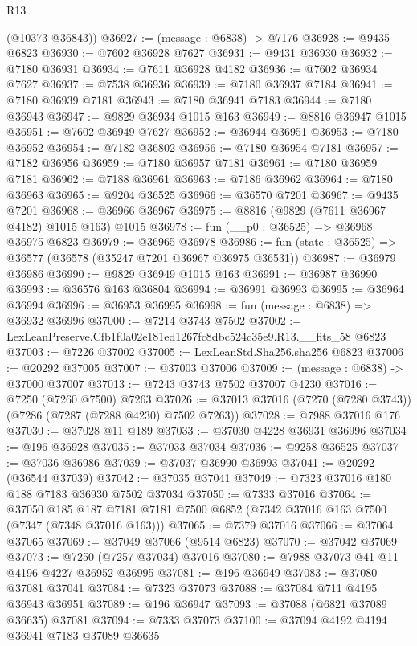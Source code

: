 \begin{lexlean}{R13}
\begin{coremodule}
      (@10373 @36843))
@36927 := (message : @6838) -> @7176
@36928 := @9435 @6823
@36930 := @7602 @36928 @7627
@36931 := @9431 @36930
@36932 := @7180 @36931
@36934 := @7611 @36928 @4182
@36936 := @7602 @36934 @7627
@36937 := @7538 @36936
@36939 := @7180 @36937 @7184
@36941 := @7180 @36939 @7181
@36943 := @7180 @36941 @7183
@36944 := @7180 @36943
@36947 := @9829 @36934 @1015 @163
@36949 := @8816 @36947 @1015
@36951 := @7602 @36949 @7627
@36952 := @36944 @36951
@36953 := @7180 @36952
@36954 := @7182 @36802
@36956 := @7180 @36954 @7181
@36957 := @7182 @36956
@36959 := @7180 @36957 @7181
@36961 := @7180 @36959 @7181
@36962 := @7188 @36961
@36963 := @7186 @36962
@36964 := @7180 @36963
@36965 := @9204 @36525
@36966 := @36570 @7201
@36967 := @9435 @7201
@36968 := @36966 @36967
@36975 := @8816 (@9829 (@7611 @36967 @4182) @1015 @163) @1015
@36978 := fun (__p0 : @36525) => @36968 @36975 @6823
@36979 := @36965 @36978
@36986 := fun (state : @36525) => @36577 (@36578 (@35247 @7201 @36967 @36975 @36531))
@36987 := @36979 @36986
@36990 := @9829 @36949 @1015 @163
@36991 := @36987 @36990
@36993 := @36576 @163 @36804
@36994 := @36991 @36993
@36995 := @36964 @36994
@36996 := @36953 @36995
@36998 := fun (message : @6838) => @36932 @36996
@37000 := @7214 @3743 @7502
@37002 := LexLeanPreserve.Cfb1f0a02e181ed1267fc8dbc524c35e9.R13.__fits_58 @6823
@37003 := @7226 @37002
@37005 := LexLeanStd.Sha256.sha256 @6823
@37006 := @20292 @37005
@37007 := @37003 @37006
@37009 := (message : @6838) -> @37000 @37007
@37013 := @7243 @3743 @7502 @37007 @4230
@37016 := @7250 (@7260 @7500) @7263
@37026 := @37013 @37016 (@7270 (@7280 @3743)) (@7286 (@7287 (@7288 @4230) @7502 @7263))
@37028 := @7988 @37016 @176
@37030 := @37028 @11 @189
@37033 := @37030 @4228 @36931 @36996
@37034 := @196 @36928
@37035 := @37033 @37034
@37036 := @9258 @36525
@37037 := @37036 @36986
@37039 := @37037 @36990 @36993
@37041 := @20292 (@36544 @37039)
@37042 := @37035 @37041
@37049 := @7323 @37016 @180 @188 @7183 @36930 @7502 @37034
@37050 := @7333 @37016
@37064 := @37050
    @185
    @187
    @7181
    @7181
    @7500
    @6852
    (@7342 @37016 @163 @7500 (@7347 (@7348 @37016 @163)))
@37065 := @7379 @37016
@37066 := @37064 @37065
@37069 := @37049 @37066 (@9514 @6823)
@37070 := @37042 @37069
@37073 := @7250 (@7257 @37034) @37016
@37080 := @7988 @37073 @41 @11 @4196 @4227 @36952 @36995
@37081 := @196 @36949
@37083 := @37080 @37081 @37041
@37084 := @7323 @37073
@37088 := @37084 @711 @4195 @36943 @36951
@37089 := @196 @36947
@37093 := @37088 (@6821 @37089 @36635) @37081
@37094 := @7333 @37073
@37100 := @37094 @4192 @4194 @36941 @7183 @37089 @36635

\end{coremodule}
\end{lexlean}
